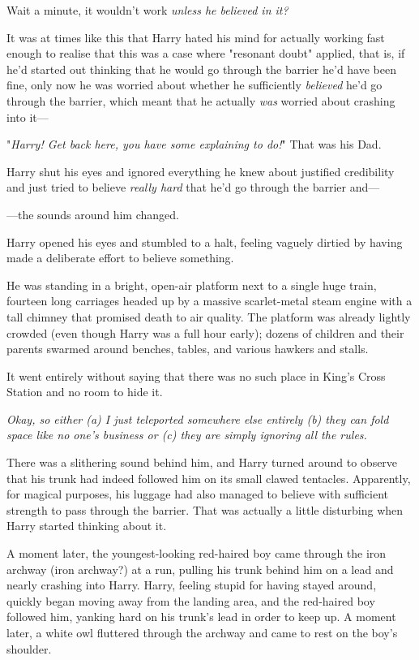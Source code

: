 Wait a minute, it wouldn't work \emph{unless he believed in it?}

It was at times like this that Harry hated his mind for actually working fast 
enough to realise that this was a case where "resonant doubt" applied, that is, 
if he'd started out thinking that he would go through the barrier he'd have 
been fine, only now he was worried about whether he sufficiently 
\emph{believed} he'd go through the barrier, which meant that he actually 
\emph{was} worried about crashing into it---

"\emph{Harry! Get back here, you have some explaining to do!}" That was his Dad.

Harry shut his eyes and ignored everything he knew about justified credibility 
and just tried to believe \emph{really hard} that he'd go through the barrier 
and---

---the sounds around him changed.

Harry opened his eyes and stumbled to a halt, feeling vaguely dirtied by having 
made a deliberate effort to believe something.

He was standing in a bright, open-air platform next to a single huge train, 
fourteen long carriages headed up by a massive scarlet-metal steam engine with 
a tall chimney that promised death to air quality. The platform was already 
lightly crowded (even though Harry was a full hour early); dozens of children 
and their parents swarmed around benches, tables, and various hawkers and 
stalls.

It went entirely without saying that there was no such place in King's Cross 
Station and no room to hide it.

\emph{Okay, so either (a) I just teleported somewhere else entirely (b) they 
can fold space like no one's business or (c) they are simply ignoring all the 
rules.}

There was a slithering sound behind him, and Harry turned around to observe 
that his trunk had indeed followed him on its small clawed tentacles. 
Apparently, for magical purposes, his luggage had also managed to believe with 
sufficient strength to pass through the barrier. That was actually a little 
disturbing when Harry started thinking about it.

A moment later, the youngest-looking red-haired boy came through the iron 
archway (iron archway?) at a run, pulling his trunk behind him on a lead and 
nearly crashing into Harry. Harry, feeling stupid for having stayed around, 
quickly began moving away from the landing area, and the red-haired boy 
followed him, yanking hard on his trunk's lead in order to keep up. A moment 
later, a white owl fluttered through the archway and came to rest on the boy's 
shoulder.

